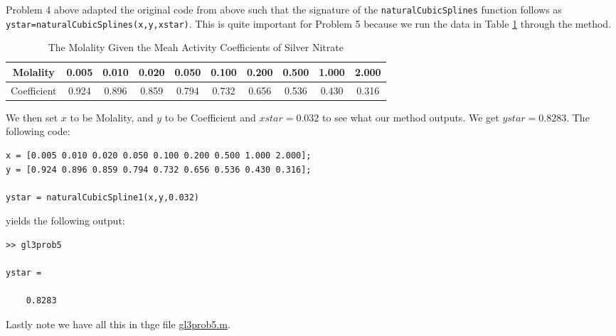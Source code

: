 \documentclass[12pt]{amsart}
\begin{document}
\begin{onehalfspace}
        Problem 4 above adapted the original code from above such that the signature of the \texttt{naturalCubicSplines}
        function follows as \texttt{ystar=naturalCubicSplines(x,y,xstar)}. This is quite important for Problem 5 because
        we run the data in Table \ref{silverNitrate} through the method.
        \begin{table}
        \begin{tabular}{|c|ccccccccc|}
            \hline
            Molality & 0.005 & 0.010 & 0.020 & 0.050 & 0.100 & 0.200 & 0.500 & 1.000 & 2.000\\
            \hline
            Coefficient & 0.924 & 0.896 & 0.859 & 0.794 & 0.732 & 0.656 & 0.536 & 0.430 & 0.316\\
            \hline
        \end{tabular}
        \caption{The Molality Given the Meah Activity Coefficients of Silver Nitrate}
        \label{silverNitrate}
        \end{table}
        We then set $x$ to be Molality, and $y$ to be Coefficient and $xstar=0.032$ to see what our method outputs.
        We get $ystar=0.8283$.
        The following code:
        \begin{tiny}
        \begin{verbatim}
x = [0.005 0.010 0.020 0.050 0.100 0.200 0.500 1.000 2.000];
y = [0.924 0.896 0.859 0.794 0.732 0.656 0.536 0.430 0.316];

ystar = naturalCubicSpline1(x,y,0.032)
        \end{verbatim}
        \end{tiny}
        yields the following output:

        \begin{tiny}
        \begin{verbatim}
>> gl3prob5

ystar =

    0.8283
        \end{verbatim}
        \end{tiny}
        Lastly note we have all this in thge file
        \underline{\href{https://github.com/chtompki/MathSpring2026/tree/main/NumericalAnalysis/GuidedLab3/gl3prob5.m}{gl3prob5.m}}.




\end{onehalfspace}
\end{document}
